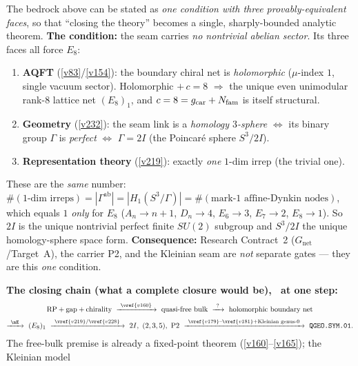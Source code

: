 \begin{keybox}
The bedrock above can be stated as \emph{one condition with three provably-equivalent faces}, so that
``closing the theory'' becomes a single, sharply-bounded analytic theorem. \textbf{The condition:} the seam
carries \emph{no nontrivial abelian sector}. Its three faces all force $E_8$:
\begin{enumerate}[leftmargin=1.7em,itemsep=1pt]
\item \textbf{AQFT} (\vref{v83}/\vref{v154}): the boundary chiral net is \emph{holomorphic} ($\mu$-index $1$,
single vacuum sector). Holomorphic $+\,c=8$ $\Rightarrow$ the unique even unimodular rank-$8$ lattice net
$(E_8)_1$, and $c=8=g_{\mathrm{car}}+N_{\mathrm{fam}}$ is itself structural.
\item \textbf{Geometry} (\vref{v232}): the seam link is a \emph{homology $3$-sphere} $\Leftrightarrow$ its
binary group $\Gamma$ is \emph{perfect} $\Leftrightarrow$ $\Gamma=2I$ (the Poincar\'e sphere $S^3/2I$).
\item \textbf{Representation theory} (\vref{v219}): exactly \emph{one} $1$-dim irrep (the trivial one).
\end{enumerate}
These are the \emph{same} number: $\#(1\text{-dim irreps})=|\Gamma^{\mathrm{ab}}|=|H_1(S^3/\Gamma)|
=\#(\text{mark-}1\text{ affine-Dynkin nodes})$, which equals $1$ \emph{only} for $E_8$ ($A_n{\to}n{+}1$,
$D_n{\to}4$, $E_6{\to}3$, $E_7{\to}2$, $E_8{\to}1$). So $2I$ is the unique nontrivial perfect finite
$SU(2)$ subgroup and $S^3/2I$ the unique homology-sphere space form. \textbf{Consequence:} Research
Contract~2 ($G_{\mathrm{net}}$/Target~A), the carrier P2, and the Kleinian seam are \emph{not} separate
gates --- they are this \emph{one} condition.
\par\smallskip\noindent\textbf{The closing chain (what a complete closure would be), \mO\ at one step:}
\[
\begin{gathered}
  \text{RP}+\text{gap}+\text{chirality}\ \xrightarrow{\ \vref{v160}\ }\ \text{quasi-free bulk}
  \ \xrightarrow{\ ?\ }\ \text{holomorphic boundary net}\\[2pt]
  \xrightarrow{\ \mE\ }\ (E_8)_1\ \xrightarrow{\ \vref{v219}/\vref{v228}\ }\ 2I,\ (2,3,5),\ \text{P2}
  \ \xrightarrow{\ \vref{v179}\text{--}\vref{v181}+\text{Kleinian genus-}0\ }\ \texttt{QGEO.SYM.01}.
\end{gathered}
\]
The free-bulk premise is already a fixed-point theorem (\vref{v160}--\vref{v165}); the Kleinian model

\end{keybox}
